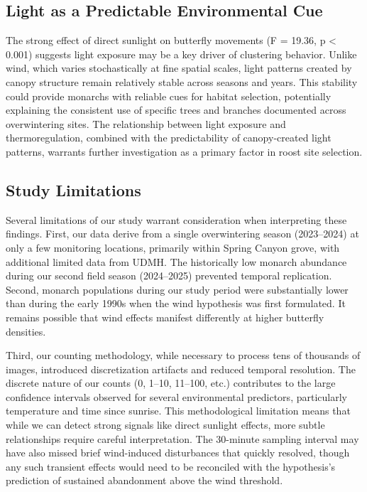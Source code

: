 \subsection{Light as a Predictable Environmental Cue}

The strong effect of direct sunlight on butterfly movements (F = 19.36, p < 0.001) suggests light exposure may be a key driver of clustering behavior. Unlike wind, which varies stochastically at fine spatial scales, light patterns created by canopy structure remain relatively stable across seasons and years. This stability could provide monarchs with reliable cues for habitat selection, potentially explaining the consistent use of specific trees and branches documented across overwintering sites. The relationship between light exposure and thermoregulation, combined with the predictability of canopy-created light patterns, warrants further investigation as a primary factor in roost site selection.

\subsection{Study Limitations}

Several limitations of our study warrant consideration when interpreting these findings. First, our data derive from a single overwintering season (2023--2024) at only a few monitoring locations, primarily within Spring Canyon grove, with additional limited data from UDMH. The historically low monarch abundance during our second field season (2024--2025) prevented temporal replication. Second, monarch populations during our study period were substantially lower than during the early 1990s when the wind hypothesis was first formulated. It remains possible that wind effects manifest differently at higher butterfly densities.

Third, our counting methodology, while necessary to process tens of thousands of images, introduced discretization artifacts and reduced temporal resolution. The discrete nature of our counts (0, 1--10, 11--100, etc.) contributes to the large confidence intervals observed for several environmental predictors, particularly temperature and time since sunrise. This methodological limitation means that while we can detect strong signals like direct sunlight effects, more subtle relationships require careful interpretation. The 30-minute sampling interval may have also missed brief wind-induced disturbances that quickly resolved, though any such transient effects would need to be reconciled with the hypothesis's prediction of sustained abandonment above the wind threshold.

